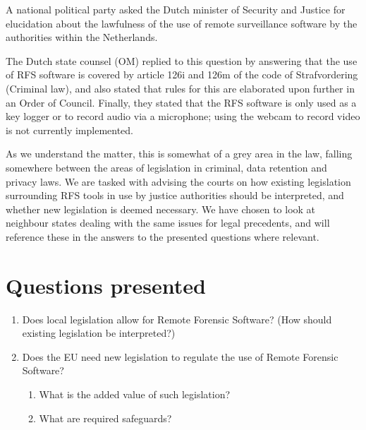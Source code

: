 \documentclass[11pt]{article} %
\begin{document}
A national political party asked the Dutch minister of Security and Justice for elucidation about the lawfulness of the use of remote surveillance software by the authorities within the Netherlands. \cite{d66kamervragen}

The Dutch state counsel (OM) replied to this question by answering that the use of RFS software is covered by article 126i and 126m of the code of Strafvordering (Criminal law), and also stated that rules for this are elaborated upon further in an Order of Council.
Finally, they stated that the RFS software is only used as a key logger or to record audio via a microphone; using the webcam to record video is not currently implemented. \cite{webwereld}

As we understand the matter, this is somewhat of a grey area in the law, falling somewhere between the areas of legislation in criminal, data retention and privacy laws.
We are tasked with advising the courts on how existing legislation surrounding RFS tools in use by justice authorities should be interpreted, and whether new legislation is deemed necessary.
We have chosen to look at neighbour states dealing with the same issues for legal precedents, and will reference these in the answers to the presented questions where relevant.




\section{Questions presented}
\begin{enumerate}
	\item{Does local legislation allow for Remote Forensic Software? (How should existing legislation be interpreted?)}
	\item{Does the EU need new legislation to regulate the use of Remote Forensic Software?}

	\begin{enumerate}
	\item{What is the added value of such legislation?}
	\item{What are required safeguards?}
	\end{enumerate}
\end{enumerate}
\end{document}
